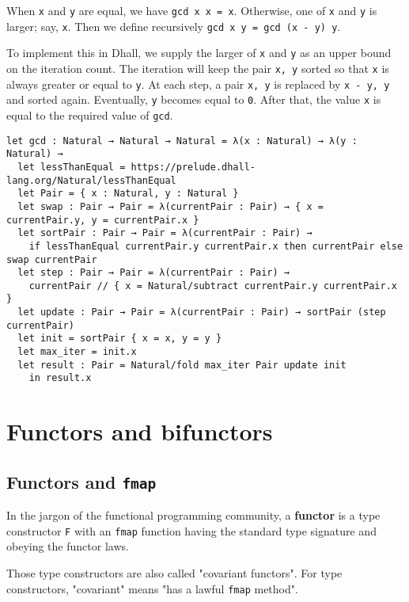 When \lstinline!x! and \lstinline!y! are equal, we have \lstinline!gcd x x = x!.
Otherwise, one of \lstinline!x! and \lstinline!y! is larger; say, \lstinline!x!. Then we define recursively \lstinline!gcd x y = gcd (x - y) y!.


To implement this in Dhall, we supply the larger of \lstinline!x! and \lstinline!y! as an upper bound on the iteration count.
The iteration will keep the pair \lstinline!x, y! sorted so that \lstinline!x! is always greater or equal to \lstinline!y!.
At each step, a pair \lstinline!x, y! is replaced by \lstinline!x - y, y! and sorted again.
Eventually, \lstinline!y! becomes equal to \lstinline!0!.
After that, the value \lstinline!x! is equal to the required value of \lstinline!gcd!.


\begin{lstlisting}[language=Dhall]
let gcd : Natural → Natural → Natural = λ(x : Natural) → λ(y : Natural) →
  let lessThanEqual = https://prelude.dhall-lang.org/Natural/lessThanEqual
  let Pair = { x : Natural, y : Natural }
  let swap : Pair → Pair = λ(currentPair : Pair) → { x = currentPair.y, y = currentPair.x }
  let sortPair : Pair → Pair = λ(currentPair : Pair) →
    if lessThanEqual currentPair.y currentPair.x then currentPair else swap currentPair
  let step : Pair → Pair = λ(currentPair : Pair) →
    currentPair // { x = Natural/subtract currentPair.y currentPair.x }
  let update : Pair → Pair = λ(currentPair : Pair) → sortPair (step currentPair)
  let init = sortPair { x = x, y = y }
  let max_iter = init.x
  let result : Pair = Natural/fold max_iter Pair update init
    in result.x
\end{lstlisting}


\section{Functors and bifunctors}


\subsection{Functors and \lstinline!fmap!}


In the jargon of the functional programming community, a \textbf{functor} is a type constructor \lstinline!F! with an \lstinline!fmap! function having the standard type signature and obeying the functor laws.


Those type constructors are also called "covariant functors".
For type constructors, "covariant" means "has a lawful \lstinline!fmap! method".


